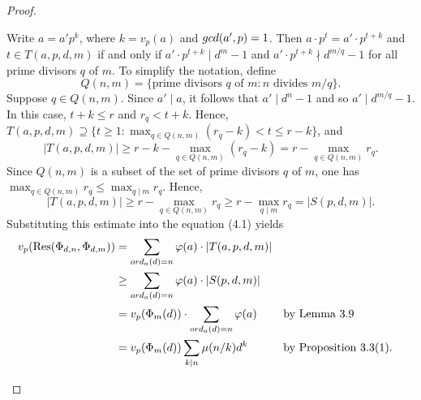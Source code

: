 \documentclass[10pt,a4paper]{amsart}
\def\gcd{{\rm gcd}}
\def\ord{{\rm ord}}
\newcommand{\res}{\operatorname{Res}}
\begin{document}
\begin{proof}
\begin{enumerate}
        Write $a = a'p^k$, where $k = v_p(a)$ and $\gcd(a',p) = 1$. Then $a\cdot p^t = a'\cdot p^{t+k}$ and 
        $t\in T(a,p,d,m)$ if and only if $a'\cdot p^{t+k}\mid d^m-1$ and $a'\cdot p^{t+k}\nmid d^{m/q}-1$ for all prime divisors $q$ of $m$. To simplify the notation, define
        $$Q(n,m) = \{\text{prime divisors }q\text{ of }m:n\text{ divides }m/q\}.$$
        Suppose $q\in Q(n,m)$. Since $a'\mid a$, it follows that $a'\mid d^n-1$ and so $a'\mid d^{m/q}-1$. In this case, $t+k\leq r$ and $r_q<t+k$. Hence, $T(a,p,d,m)\supseteq \{t\geq 1:\max_{q\in Q(n,m)}(r_q-k)<t\leq r-k\}$, and
        $$|T(a,p,d,m)|\geq r-k-\max_{q\in Q(n,m)}(r_q-k) = r-\max_{q\in Q(n,m)}r_q.$$
        Since $Q(n,m)$ is a subset of the set of prime divisors $q$ of $m$, one has $\max_{q\in Q(n,m)}r_q\leq \max_{q\mid m}r_q$. Hence, 
        $$|T(a,p,d,m)| \geq r-\max_{q\in Q(n,m)}r_q\geq r-\max_{q\mid m}r_q = |S(p,d,m)|.$$
        Substituting this estimate into the equation (4.1) yields
        \begin{align*}
            v_p(\res(\Phi_{d,n},\Phi_{d,m})) &= \sum_{\ord_a(d) = n}\varphi(a)\cdot|T(a,p,d,m)|\\
            &\geq \sum_{\ord_a(d) = n}\varphi(a)\cdot|S(p,d,m)|\\
            &= v_p(\Phi_{m}(d))\cdot\sum_{\ord_a(d) = n}\varphi(a)&&\text{by Lemma 3.9}\\
            &= v_p(\Phi_m(d))\sum_{k\mid n}\mu(n/k)d^k&&\text{by Proposition 3.3(1)}.
        \end{align*}
    \end{enumerate}
\end{proof}
\end{document}
